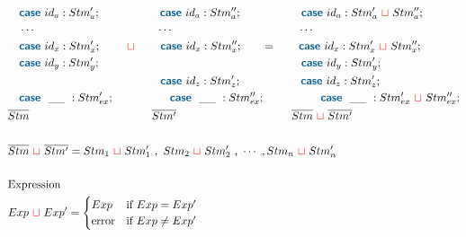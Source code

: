 \documentclass{thesis}
\newcommand{\mblue}[1]{\textbf{\textsf{\color{MidnightBlue}#1}}}
\newcommand{\mg}{~{\color{red}{\sqcup}}~} %
\begin{document}
\begin{align*}
  & ~~~\mblue{case}~id_a : Stm'_a; ~~~~~~~~~~~~~~~~\mblue{case}~id_a : Stm''_a; ~~~~~~~~~~~~~~~~\mblue{case}~id_a : Stm'_a \mg Stm''_a;\\
  & ~~~\cdots ~~~~~~~~~~~~~~~~~~~~~~~~~~~~~~~~~\cdots ~~~~~~~~~~~~~~~~~~~~~~~~~~~~~~~~~~\cdots\\
  & ~~~\mblue{case}~id_x : Stm'_x; ~~~~~~\mg~~~~~~\mblue{case}~id_x : Stm''_x; ~~~~~~=~~~~~~\mblue{case}~id_x : Stm'_x \mg Stm''_x;\\
  & ~~~\mblue{case}~id_y : Stm'_y; ~~~~~~~~~~~~~~~~~~~~~~~~~~~~~~~~~~~~~~~~~~~~~~~~~~~~~~\mblue{case}~id_y : Stm'_y; \\
  & ~~~~~~~~~~~~~~~~~~~~~~~~~~~~~~~~~~~~~~~~~\mblue{case}~id_z : Stm'_z;~~~~~~~~~~~~~~~~\mblue{case}~id_z : Stm'_z;\\
  & ~~~\mblue{case}~~\_\_ ~: Stm'_{ex}; ~~~~~~~~~~~~~~~\mblue{case}~~\_\_ ~: Stm''_{ex}; ~~~~~~~~~~~~~~~\mblue{case}~~\_\_ ~:Stm'_{ex} \mg Stm''_{ex};\\
  & \overline{Stm} ~~~~~~~~~~~~~~~~~~~~~~~~~~~~~~~~~ \overline{Stm'} ~~~~~~~~~~~~~~~~~~~~~~~~~~~~~~~ \overline{Stm} \mg \overline{Stm'}\\
  \\
  & \overline{Stm} \mg \overline{Stm'} = Stm_1 \mg Stm_1'~,~Stm_2 \mg Stm_2'~,~\cdots~,Stm_n \mg Stm'_n\\
  \\
  & \text{Expression}\\
  & Exp \mg Exp' =
  \begin{cases}
    Exp & \text{if}~ Exp = Exp'\\
    \text{error} & \text{if}~ Exp \neq Exp'
  \end{cases}\\
\end{align*}
\end{document}
